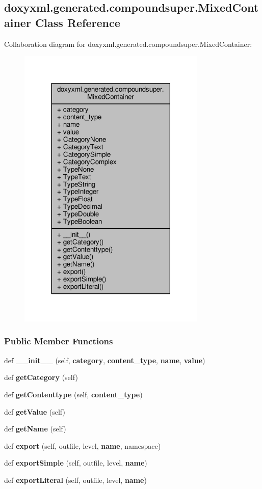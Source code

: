 \subsection{doxyxml.\+generated.\+compoundsuper.\+Mixed\+Container Class Reference}
\label{classdoxyxml_1_1generated_1_1compoundsuper_1_1MixedContainer}


Collaboration diagram for doxyxml.\+generated.\+compoundsuper.\+Mixed\+Container\+:
\nopagebreak
\begin{figure}[H]
\begin{center}
\leavevmode
\includegraphics[width=254pt]{d1/dcc/classdoxyxml_1_1generated_1_1compoundsuper_1_1MixedContainer__coll__graph}
\end{center}
\end{figure}
\subsubsection*{Public Member Functions}
\begin{DoxyCompactItemize}
\item 
def {\bf \+\_\+\+\_\+init\+\_\+\+\_\+} (self, {\bf category}, {\bf content\+\_\+type}, {\bf name}, {\bf value})
\item 
def {\bf get\+Category} (self)
\item 
def {\bf get\+Contenttype} (self, {\bf content\+\_\+type})
\item 
def {\bf get\+Value} (self)
\item 
def {\bf get\+Name} (self)
\item 
def {\bf export} (self, outfile, level, {\bf name}, namespace)
\item 
def {\bf export\+Simple} (self, outfile, level, {\bf name})
\item 
def {\bf export\+Literal} (self, outfile, level, {\bf name})
\end{DoxyCompactItemize}
